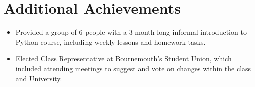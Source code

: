 \section{Additional Achievements}

\begin{itemize}
	\setlength\itemsep{0em}
	\item Provided a group of 6 people with a 3 month long informal introduction to Python course, including weekly lessons and homework tasks. 
	\item Elected Class Representative at Bournemouth's Student Union, which included attending meetings to suggest and vote on changes within the class and University.
\end{itemize}